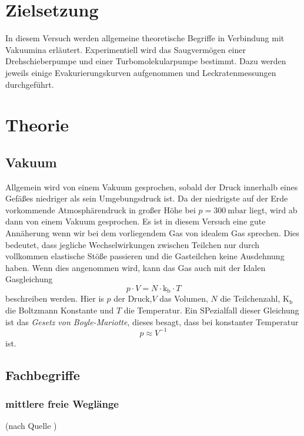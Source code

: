 \section{Zielsetzung}

	In diesem Versuch werden allgemeine theoretische Begriffe in Verbindung mit Vakuumina erläutert.
	Experimentiell wird das Saugvermögen einer Drehschieberpumpe und einer Turbomolekularpumpe bestimmt.
	Dazu werden jeweils einige Evakurierungskurven aufgenommen und Leckratenmessungen durchgeführt.

\section{Theorie}
	
	\subsection{Vakuum}
		
		Allgemein wird von einem Vakuum gesprochen, sobald der Druck innerhalb eines Gefäßes niedriger als sein Umgebungsdruck ist.
		Da der niedrigste auf der Erde vorkommende Atmosphärendruck in großer Höhe bei $p = \SI{300}{\milli\bar}$ liegt, wird ab dann von einem Vakuum gesprochen.
		Es ist in diesem Versuch eine gute Annäherung wenn wir bei dem vorliegendem Gas von idealem Gas sprechen. 
		Dies bedeutet, dass jegliche Wechselwirkungen zwischen Teilchen nur durch vollkommen elastische Stöße passieren und die Gasteilchen keine Ausdehnung haben.
		Wenn dies angenommen wird, kann das Gas auch mit der Idalen Gasgleichung
		\begin{equation}
			p \cdot V = N \cdot \text{k}_\text{b} \cdot T
		\end{equation}
		beschreiben werden.
		Hier is $p$ der Druck,$V$ das Volumen, $N$ die Teilchenzahl, $\text{K}_\text{b}$ die Boltzmann Konstante und $T$ die Temperatur. 
		Ein SPezialfall dieser Gleichung ist das \textit{Gesetz von Boyle-Mariotte}, dieses besagt, dass bei konstanter Temperatur
		\begin{equation}
			p \approx V^{-1}
		\end{equation}
		ist.

	\subsection{Fachbegriffe}

		\subsubsection{mittlere freie Weglänge}(nach Quelle \cite{wiki:mfW})
		
